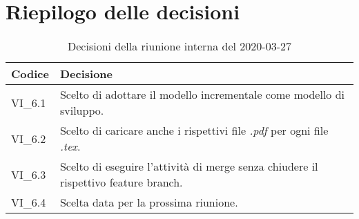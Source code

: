 \section{Riepilogo delle decisioni}
\begin{longtable}{ 
	 >{\centering}p{} >{}p{} }
	
	\caption{Decisioni della riunione interna del 2020-03-27}\\	
	
	\textbf{\color{white}Codice} & 
	\textbf{\color{white}Decisione} 
	\tabularnewline  
	\endhead
	
	VI\_6.1 & Scelto di adottare il modello incrementale come modello di sviluppo. \\
	VI\_6.2 & Scelto di caricare anche i rispettivi file \textit{.pdf} per ogni file \textit{.tex}. \\
	VI\_6.3 & Scelto di eseguire l'attività di merge senza chiudere il rispettivo feature branch. \\
	VI\_6.4 & Scelta data per la prossima riunione. \\
	
\end{longtable}